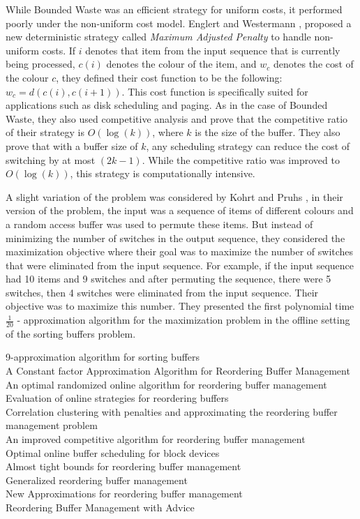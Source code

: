 While Bounded Waste was an efficient strategy for uniform costs, it performed poorly under the non-uniform cost model.  Englert and  Westermann  \cite{englert2005reordering}, proposed a new deterministic strategy called \textit{Maximum Adjusted Penalty} to handle non-uniform costs. If $i$ denotes that item from the input sequence that is currently being processed, $c(i)$ denotes the colour of the item, and $w_c$ denotes the cost of the colour $c$, they defined their cost function to be the following: $w_c = d(c(i), c(i + 1))$. This cost function is specifically suited for applications such as disk scheduling and paging. As in the case of Bounded Waste, they also used competitive analysis and prove that the competitive ratio of their strategy is $O(\log(k))$, where $k$ is the size of the buffer. They also prove that with a buffer size of $k$, any scheduling strategy can reduce the cost of switching by at most $(2k - 1)$. While the competitive ratio was improved to $O(\log(k))$, this strategy is computationally intensive. 

A slight variation of the problem was considered by Kohrt and Pruhs \cite{kohrt2004constant}, in their version of the problem, the input was a sequence of items of different colours and a random access buffer was used to permute these items. But instead of minimizing the number of switches in the output sequence, they considered the maximization objective where their goal was to maximize the number of switches that were eliminated from the input sequence. For example, if the input sequence had 10 items and 9 switches and after permuting the sequence, there were 5 switches, then 4 switches were eliminated from the input sequence. Their objective was to maximize this number. They presented the first polynomial time $\frac{1}{20}$ - approximation algorithm for the maximization problem in the offline setting of the sorting buffers problem.  

9-approximation algorithm for sorting buffers \cite{bar20059} \\ 

A Constant factor Approximation Algorithm for Reordering Buffer Management
\cite{avigdor2013constant} \\
An optimal randomized online algorithm for reordering buffer management
\cite{avigdor2013optimal} \\
Evaluation of online strategies for reordering buffers
\cite{englert2009evaluation}\\
Correlation clustering with penalties and approximating the reordering buffer
management problem \cite{aboud2008correlation} \\
An improved competitive algorithm for reordering buffer management
\cite{avigdor2013improved} \\
Optimal online buffer scheduling for block devices \cite{adamaszek2012optimal}
\\
Almost tight bounds for reordering buffer management \cite{adamaszek2011almost}
\\
Generalized reordering buffer management \cite{azar2014generalized} \\
New Approximations for reordering buffer management \cite{im2014new} \\
Reordering Buffer Management with Advice \cite{adamaszek2013reordering}